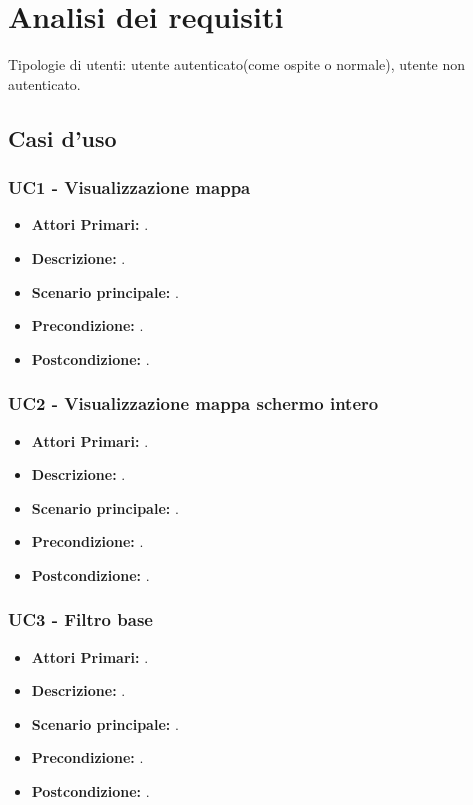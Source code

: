 \section{Analisi dei requisiti}
Tipologie di utenti: utente autenticato(come ospite o normale), utente non autenticato.

\subsection{Casi d'uso}

\subsubsection{ UC1 - Visualizzazione mappa}
\begin{itemize}
	\item\textbf{Attori Primari:} .
	\item\textbf{Descrizione:} .
	\item\textbf{Scenario principale:} .
	\item\textbf{Precondizione:} .
	\item\textbf{Postcondizione:} .
\end{itemize}

\subsubsection{ UC2 - Visualizzazione mappa schermo intero}
\begin{itemize}
	\item\textbf{Attori Primari:} .
	\item\textbf{Descrizione:} .
	\item\textbf{Scenario principale:} .
	\item\textbf{Precondizione:} .
	\item\textbf{Postcondizione:} .
\end{itemize}

\subsubsection{ UC3 - Filtro base}
\begin{itemize}
	\item\textbf{Attori Primari:} .
	\item\textbf{Descrizione:} .
	\item\textbf{Scenario principale:} .
	\item\textbf{Precondizione:} .
	\item\textbf{Postcondizione:} .
\end{itemize}

